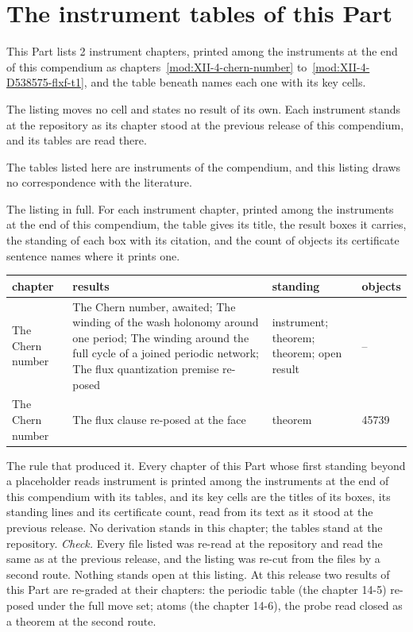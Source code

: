 \section{The instrument tables of this Part}\label{mod:XIV-L-the-instrument-tables-at-the-repository}
\begin{chtable}\label{box:XIV-L-the-instrument-tables-at-the-repository:1}
This Part lists 2 instrument chapters, printed among the instruments at the end of this compendium as chapters~\ref{mod:XII-4-chern-number} to~\ref{mod:XII-4-D538575-flxf-t1}, and the table beneath names each one with its key cells.
\end{chtable}
The listing moves no cell and states no result of its own. Each instrument stands at the repository as its chapter stood at the previous release of this compendium, and its tables are read there.
\begin{chbridge}
The tables listed here are instruments of the compendium, and this listing draws no correspondence with the literature.
\end{chbridge}
\begin{chproof}[instrument]
The listing in full. For each instrument chapter, printed among the instruments at the end of this compendium, the table gives its title, the result boxes it carries, the standing of each box with its citation, and the count of objects its certificate sentence names where it prints one.
{\small
\begin{longtable}{p{38mm}p{63mm}p{30mm}p{14mm}}
\hline
chapter & results & standing & objects \\
\hline
\endhead
The Chern number & The Chern number, awaited; The winding of the wash holonomy around one period; The winding around the full cycle of a joined periodic network; The flux quantization premise re-posed & instrument; theorem; theorem; open result & -- \\
The Chern number & The flux clause re-posed at the face & theorem & 45739 \\
\hline
\end{longtable}
}
The rule that produced it. Every chapter of this Part whose first standing beyond a placeholder reads instrument is printed among the instruments at the end of this compendium with its tables, and its key cells are the titles of its boxes, its standing lines and its certificate count, read from its text as it stood at the previous release.
No derivation stands in this chapter; the tables stand at the repository.
\emph{Check.} Every file listed was re-read at the repository and read the same as at the previous release, and the listing was re-cut from the files by a second route.
Nothing stands open at this listing. At this release two results of this Part are re-graded at their chapters: the periodic table (the chapter 14-5) re-posed under the full move set; atoms (the chapter 14-6), the probe read closed as a theorem at the second route.
\end{chproof}
\label{chend:XIV-L-the-instrument-tables-at-the-repository}
